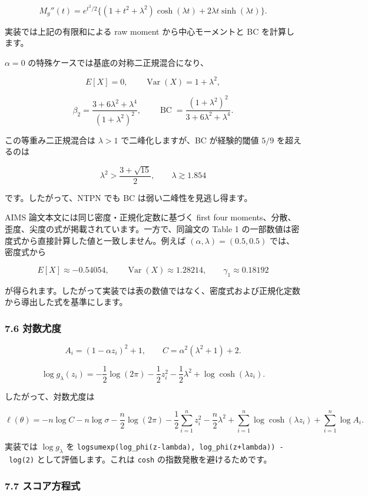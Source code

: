 \documentclass[
]{article}
\begin{document}
\[
M_g''(t)=e^{t^2/2}
\{(1+t^2+\lambda^2)\cosh(\lambda t)+2\lambda t\sinh(\lambda t)\}.
\]

実装では上記の有限和による raw moment から中心モーメントと BC
を計算します。

\(\alpha=0\) の特殊ケースでは基底の対称二正規混合になり、

\[
E[X]=0,
\qquad
\operatorname{Var}(X)=1+\lambda^2,
\]

\[
\beta_2=
\frac{3+6\lambda^2+\lambda^4}{(1+\lambda^2)^2},
\qquad
\operatorname{BC}
=
\frac{(1+\lambda^2)^2}{3+6\lambda^2+\lambda^4}.
\]

この等重み二正規混合は \(\lambda>1\) で二峰化しますが、BC が経験的閾値
\(5/9\) を超えるのは

\[
\lambda^2>\frac{3+\sqrt{15}}{2},
\qquad
\lambda\gtrsim1.854
\]

です。したがって、NTPN でも BC は弱い二峰性を見逃し得ます。

AIMS 論文本文には同じ密度・正規化定数に基づく first four
moments、分散、歪度、尖度の式が掲載されています。一方で、同論文の Table
1 の一部数値は密度式から直接計算した値と一致しません。例えば
\((\alpha,\lambda)=(0.5,0.5)\) では、密度式から

\[
E[X]\approx -0.54054,
\qquad
\operatorname{Var}(X)\approx 1.28214,
\qquad
\gamma_1\approx 0.18192
\]

が得られます。したがって実装では表の数値ではなく、密度式および正規化定数から導出した式を基準にします。

\hypertarget{ux5bfeux6570ux5c24ux5ea6-4}{%
\subsubsection{7.6 対数尤度}\label{ux5bfeux6570ux5c24ux5ea6-4}}

\[
A_i=(1-\alpha z_i)^2+1,
\qquad
C=\alpha^2(\lambda^2+1)+2.
\]

\[
\log g_\lambda(z_i)
=-\frac{1}{2}\log(2\pi)-\frac{1}{2}z_i^2-\frac{1}{2}\lambda^2+
\log\cosh(\lambda z_i).
\]

したがって、対数尤度は

\[
\ell(\theta)
= -n\log C-n\log\sigma-\frac{n}{2}\log(2\pi)
-\frac{1}{2}\sum_{i=1}^{n}z_i^2
-\frac{n}{2}\lambda^2
+\sum_{i=1}^{n}\log\cosh(\lambda z_i)
+\sum_{i=1}^{n}\log A_i.
\]

実装では \(\log g_\lambda\) を
\texttt{logsumexp(log\_phi(z-lambda),\ log\_phi(z+lambda))\ -\ log(2)}
として評価します。これは \texttt{cosh} の指数発散を避けるためです。

\hypertarget{ux30b9ux30b3ux30a2ux65b9ux7a0bux5f0f}{%
\subsubsection{7.7
スコア方程式}\label{ux30b9ux30b3ux30a2ux65b9ux7a0bux5f0f}}
\end{document}
